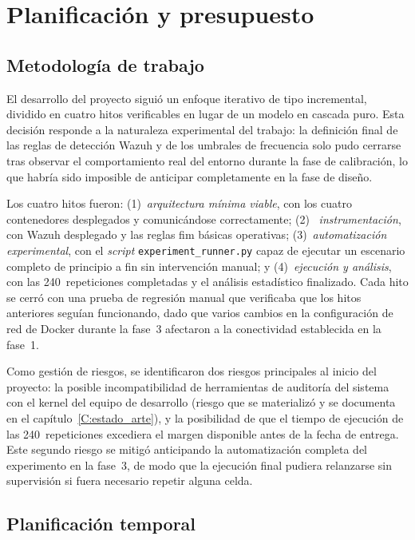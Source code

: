 \documentclass[../main.tex]{subfiles}
\begin{document}
\section{Planificación y presupuesto}

\subsection{Metodología de trabajo}

El desarrollo del proyecto siguió un enfoque iterativo de tipo
incremental, dividido en cuatro hitos verificables en lugar de un modelo
en cascada puro. Esta decisión responde a la naturaleza experimental del
trabajo: la definición final de las reglas de detección Wazuh y de los
umbrales de frecuencia solo pudo cerrarse tras observar el comportamiento
real del entorno durante la fase de calibración, lo que habría sido
imposible de anticipar completamente en la fase de diseño.

Los cuatro hitos fueron: (1)~\emph{arquitectura mínima viable}, con los
cuatro contenedores desplegados y comunicándose correctamente; (2)~
\emph{instrumentación}, con Wazuh desplegado y las reglas \gls{fim} básicas
operativas; (3)~\emph{automatización experimental}, con el
\textit{script} \texttt{experiment\_runner.py} capaz de ejecutar un
escenario completo de principio a fin sin intervención manual; y
(4)~\emph{ejecución y análisis}, con las 240~repeticiones completadas y el
análisis estadístico finalizado. Cada hito se cerró con una prueba de
regresión manual que verificaba que los hitos anteriores seguían
funcionando, dado que varios cambios en la configuración de red de Docker
durante la fase~3 afectaron a la conectividad establecida en la fase~1.

Como gestión de riesgos, se identificaron dos riesgos principales al
inicio del proyecto: la posible incompatibilidad de herramientas de
auditoría del sistema con el kernel del equipo de desarrollo (riesgo que
se materializó y se documenta en el capítulo~\ref{C:estado_arte}), y la
posibilidad de que el tiempo de ejecución de las 240~repeticiones excediera
el margen disponible antes de la fecha de entrega. Este segundo riesgo se
mitigó anticipando la automatización completa del experimento en la
fase~3, de modo que la ejecución final pudiera relanzarse sin supervisión
si fuera necesario repetir alguna celda.

\subsection{Planificación temporal}
\end{document}
